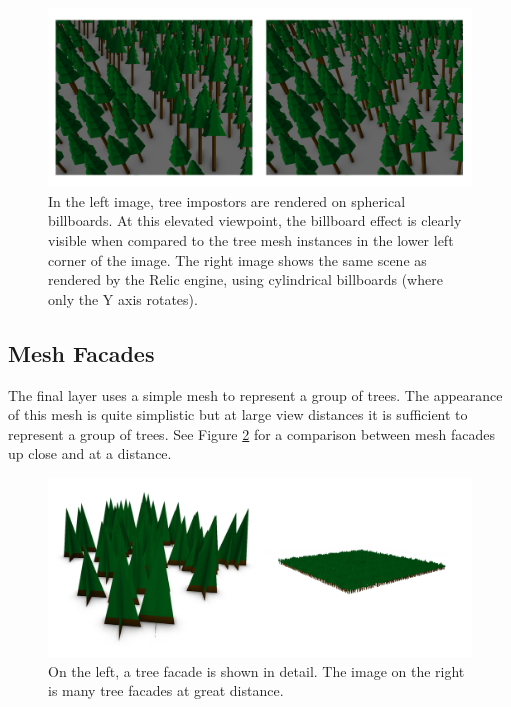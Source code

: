 \begin{figure}
	\centering
		\includegraphics[width=1.0\textwidth]{figures/tree_billboards.jpg}
	\caption{
		In the left image, tree impostors are rendered on spherical billboards.
		At this elevated viewpoint, the billboard effect is clearly visible when compared to the tree mesh instances in the lower left corner of the image.
		The right image shows the same scene as rendered by the Relic engine, using cylindrical billboards (where only the Y axis rotates).
	}
	\label{fig:tree_billboards}
\end{figure}

\subsection{Mesh Facades}

The final layer uses a simple mesh to represent a group of trees.
The appearance of this mesh is quite simplistic but at large view distances it is sufficient to represent a group of trees.
See Figure \ref{fig:tree_facades} for a comparison between mesh facades up close and at a distance.

\begin{figure}
	\centering
		\includegraphics[width=1.0\textwidth]{figures/tree_facades.jpg}
	\caption{
		On the left, a tree facade is shown in detail.
		The image on the right is many tree facades at great distance.
	}
	\label{fig:tree_facades}
\end{figure}

